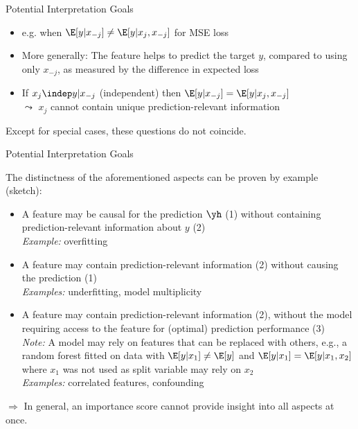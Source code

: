 \begin{vbframe}{Potential Interpretation Goals}
\begin{enumerate}
    \begin{itemize}
      \item e.g. when $\E[y|x_{-j}] \neq \E[y|x_j, x_{-j}]$ for MSE loss
      \item More generally: The feature helps to predict the target $y$, compared to using only $x_{-j}$, as measured by the difference in expected loss
      \item If $x_j \indep y | x_{-j}$ (independent) then $\E[y|x_{-j}] = \E[y|x_j, x_{-j}]$ \\
      $\leadsto$ $x_j$ cannot contain unique prediction-relevant information
    \end{itemize}
\end{enumerate}
Except for special cases, these questions do not coincide.
\end{vbframe}

\begin{vbframe}{Potential Interpretation Goals}

The distinctness of the aforementioned aspects can be proven by example (sketch):

\begin{itemize}
  \item A feature may be causal for the prediction $\yh$ (1) without containing prediction-relevant information about $y$ (2)\\
  \textit{Example:} overfitting
  \item A feature may contain prediction-relevant information (2) without causing the prediction (1)\\ \textit{Examples:} underfitting, model multiplicity
  \item A feature may contain prediction-relevant information (2), without the model requiring access to the feature for (optimal) prediction performance (3)\\
  \textit{Note:} A model may rely on features that can be replaced with others, e.g., a random forest fitted on data with $\E[y|x_1] \neq \E[y]$ and $\E[y|x_1] = \E[y|x_1, x_2]$ where $x_1$ was not used as split variable may rely on $x_2$ %
  \\
  \textit{Examples:} correlated features, confounding
  \end{itemize}
$\Rightarrow$ In general, an importance score cannot provide insight into all aspects at once.
\end{vbframe}

